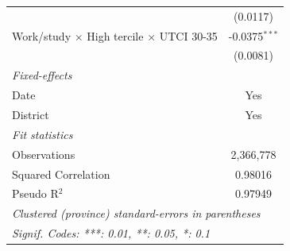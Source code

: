 \begin{table}[htbp]
\begin{tabular}{lc}
                                                                        & (0.0117)\\   
      Work/study $\times$ High tercile $\times$ UTCI 30-35              & -0.0375$^{***}$\\   
                                                                        & (0.0081)\\   
      \midrule
      \emph{Fixed-effects}\\
      Date                                                              & Yes\\  
      District                                                          & Yes\\  
      \midrule
      \emph{Fit statistics}\\
      Observations                                                      & 2,366,778\\  
      Squared Correlation                                               & 0.98016\\  
      Pseudo R$^2$                                                      & 0.97949\\  
      \midrule \midrule
      \multicolumn{2}{l}{\emph{Clustered (province) standard-errors in parentheses}}\\
      \multicolumn{2}{l}{\emph{Signif. Codes: ***: 0.01, **: 0.05, *: 0.1}}\\
   \end{tabular}
\end{table}


